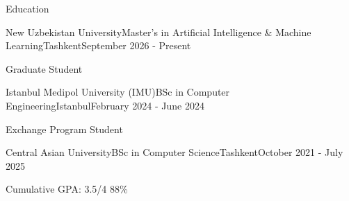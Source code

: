\begin{resume_section}{Education}

\begin{resume_employer}{New Uzbekistan University}{Master's in Artificial Intelligence \& Machine Learning}{Tashkent}{September 2026 - Present}
      \item Graduate Student
  \end{resume_employer}

\begin{resume_employer}{Istanbul Medipol University (IMU)}{BSc in Computer Engineering}{Istanbul}{February 2024 - June 2024}
      \item Exchange Program Student
  \end{resume_employer}

   \begin{resume_employer}{Central Asian University}{BSc in Computer Science}{Tashkent}{October 2021 - July 2025}
      \item Cumulative GPA: 3.5/4 88\%
  \end{resume_employer}
  
\end{resume_section}
